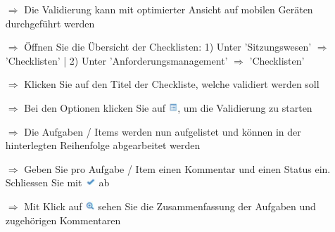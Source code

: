 \documentclass{article}
\begin{document}
\begin{multicols}{2}

\begin{tcolorbox}[colback=blue!5,colframe=blue!40!black,title=Checkliste validieren]
\begin{itemize}
	\item[$\Longrightarrow$] Die Validierung kann mit optimierter Ansicht auf mobilen Geräten durchgeführt werden
  \item[$\Longrightarrow$] Öffnen Sie die Übersicht der Checklisten: 1) Unter 'Sitzungswesen' $\Rightarrow$ 'Checklisten' | 2) Unter 'Anforderungsmanagement' $\Longrightarrow$ 'Checklisten'
	\item[$\Longrightarrow$] Klicken Sie auf den Titel der Checkliste, welche validiert werden soll
	\item[$\Longrightarrow$] Bei den Optionen klicken Sie auf \includegraphics[height=10pt]{Icons/Listensymbol.jpg}, um die Validierung zu starten
	\item[$\Longrightarrow$] Die Aufgaben / Items werden nun aufgelistet und können	in der hinterlegten Reihenfolge abgearbeitet werden
	\item[$\Longrightarrow$] Geben Sie pro Aufgabe / Item einen Kommentar und einen Status ein. Schliessen Sie mit \includegraphics[height=10pt]{Icons/Gutzeichen.jpg} ab
	\item[$\Longrightarrow$] Mit Klick auf \includegraphics[height=10pt]{Icons/Lupe.jpg} sehen Sie die Zusammenfassung der Aufgaben und zugehörigen Kommentaren
\end{itemize}
\end{tcolorbox}

\end{multicols}

\end{document}
